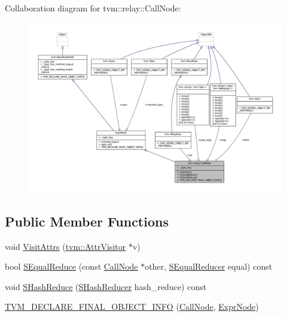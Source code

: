 Collaboration diagram for tvm\+:\+:relay\+:\+:Call\+Node\+:
\nopagebreak
\begin{figure}[H]
\begin{center}
\leavevmode
\includegraphics[width=350pt]{classtvm_1_1relay_1_1CallNode__coll__graph}
\end{center}
\end{figure}
\subsection*{Public Member Functions}
\begin{DoxyCompactItemize}
\item 
void \hyperlink{classtvm_1_1relay_1_1CallNode_a28ee1603f20958c8c4fe54d8df3ac558}{Visit\+Attrs} (\hyperlink{classtvm_1_1AttrVisitor}{tvm\+::\+Attr\+Visitor} $\ast$v)
\item 
bool \hyperlink{classtvm_1_1relay_1_1CallNode_af6d816670918e299428a54661b0d6ed3}{S\+Equal\+Reduce} (const \hyperlink{classtvm_1_1relay_1_1CallNode}{Call\+Node} $\ast$other, \hyperlink{classtvm_1_1SEqualReducer}{S\+Equal\+Reducer} equal) const 
\item 
void \hyperlink{classtvm_1_1relay_1_1CallNode_a1e34c40a1c5a0a5cada02448cd068b2d}{S\+Hash\+Reduce} (\hyperlink{classtvm_1_1SHashReducer}{S\+Hash\+Reducer} hash\+\_\+reduce) const 
\item 
\hyperlink{classtvm_1_1relay_1_1CallNode_afb0adb68867bdeba9c635eaed3526abb}{T\+V\+M\+\_\+\+D\+E\+C\+L\+A\+R\+E\+\_\+\+F\+I\+N\+A\+L\+\_\+\+O\+B\+J\+E\+C\+T\+\_\+\+I\+N\+FO} (\hyperlink{classtvm_1_1relay_1_1CallNode}{Call\+Node}, \hyperlink{namespacetvm_1_1relay_a387f18e050d016c52ea6c4781e7cff6c}{Expr\+Node})
\end{DoxyCompactItemize}
